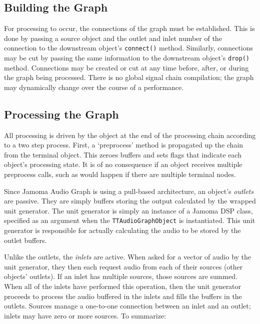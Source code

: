\documentclass[twoside,a4paper]{article}
\begin{document}


\subsection{Building the Graph} %

For processing to occur, the connections of the graph must be established.  
This is done by passing a source object and the outlet and inlet number of the connection to the downstream object's \texttt{connect()} method.  
Similarly, connections may be cut by passing the same information to the downstream object's \texttt{drop()} method.  
Connections may be created or cut at any time before, after, or during the graph being processed.  
There is no global signal chain compilation; the graph may dynamically change over the course of a performance.



\subsection{Processing the Graph} %

All processing is driven by the object at the end of the processing chain according to a two step process.  
First, a `preprocess' method is propagated up the chain from the terminal object.  
This zeroes buffers and sets flags that indicate each object's processing state.  
It is of no consequence if an object receives multiple preprocess calls, such as would happen if there are multiple terminal nodes.

Since Jamoma Audio Graph is using a pull-based architecture, an object's \emph{outlets} are passive.  
They are simply buffers storing the output calculated by the wrapped unit generator.  
The unit generator is simply an instance of a Jamoma DSP class, specified as an argument when the \texttt{TTAudioGraphObject} is instantiated. 
This unit generator is responsible for actually calculating the audio to be stored by the outlet buffers.

Unlike the outlets, the \emph{inlets} are active.  
When asked for a vector of audio by the unit generator, they then each request audio from each of their sources (other objects' outlets).  
If an inlet has multiple sources, those sources are summed.  
When all of the inlets have performed this operation, then the unit generator proceeds to process the audio buffered in the inlets and fills the buffers in the outlets.  
Sources manage a one-to-one connection between an inlet and an outlet; inlets may have zero or more sources.  
To summarize:
\end{document}
